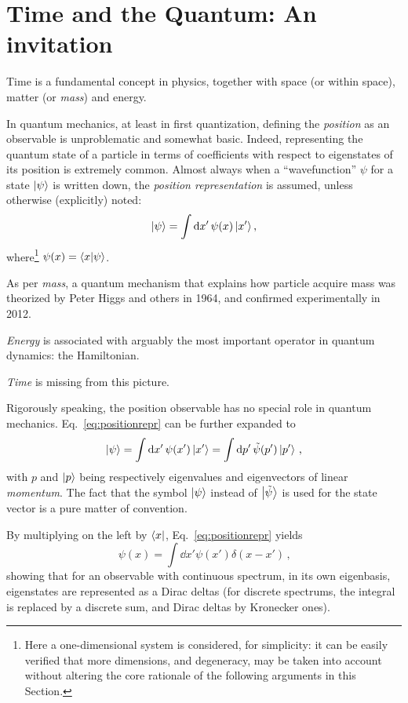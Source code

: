 \section{Time and the Quantum: An invitation}

Time is a fundamental concept in physics, together with space (or  within space),
matter (or \emph{mass}) and energy.

In quantum mechanics, at least in first quantization, defining the \emph{position} as
an observable is unproblematic and somewhat basic.
Indeed, representing the quantum state of a particle
in terms of coefficients with respect to eigenstates of its position is extremely common.
Almost always when a ``wavefunction'' $\psi$
for a state $\ket{\psi}$
is written down, the \emph{position representation}
is assumed, unless otherwise (explicitly) noted:
\begin{equation}\label{eq:positionrepr}
  \ket{\psi} = \int \dd{x'} \psi(x) \ket{x'} \text{,}
\end{equation}
where\footnote{
  Here a one-dimensional system is considered, for simplicity:
  it can be easily verified that more dimensions,
  and degeneracy, may be taken into account without altering the core rationale of the
  following arguments in this Section.
}
$\psi(x) = \braket{x}{\psi}$.

As per \emph{mass}, a quantum mechanism that explains how particle acquire mass was theorized by
Peter Higgs and others in 1964, and confirmed experimentally in 2012.

\emph{Energy} is associated with arguably the most important operator in quantum dynamics: the Hamiltonian.

\emph{Time} is missing from this picture.

Rigorously speaking, the position observable has no special role in quantum mechanics.
Eq.~\eqref{eq:positionrepr} can be further expanded to
\begin{equation}\label{eq:qprepr}
  \ket{\psi} = \int \dd{x'} \psi(x') \ket{x'} = \int \dd{p'} \tilde{\psi}(p') \ket{p'} \,\text{,}
\end{equation}
with $p$ and $\ket{p}$ being respectively eigenvalues and eigenvectors of linear \emph{momentum}.
The fact that the symbol $\ket{\psi}$ instead of $\ket{\tilde{\psi}}$
is used for the state vector is a pure matter of convention.

By multiplying on the left by $\bra{x}$, Eq.~\eqref{eq:positionrepr} yields
\begin{equation}\label{eq:diracdeltax}
  \psi(x) = \int \dd{x'} \psi(x') \delta(x-x') \,\text{,}
\end{equation}
showing that for an observable with continuous spectrum,
in its own eigenbasis, eigenstates are represented as a Dirac deltas
(for discrete spectrums, the integral is replaced by a discrete sum,
and Dirac deltas by Kronecker ones).

